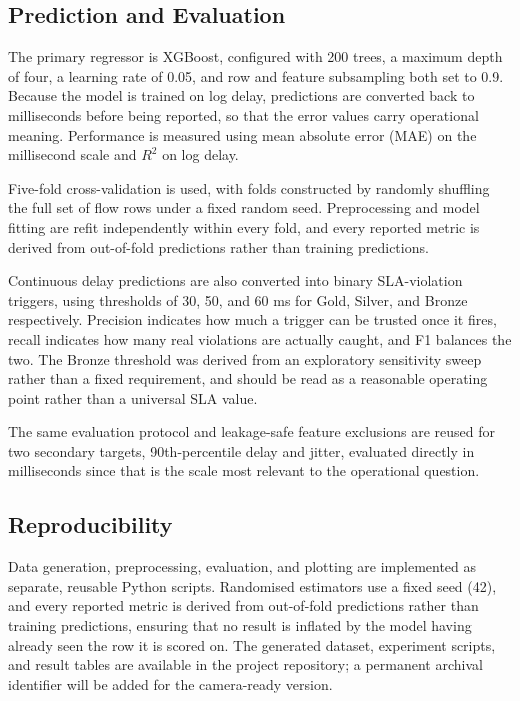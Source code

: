 \documentclass[conference]{IEEEtran}
\begin{document}
\subsection{Prediction and Evaluation}

The primary regressor is XGBoost, configured with 200 trees, a maximum depth of four, a learning rate of 0.05, and row and feature subsampling both set to 0.9. Because the model is trained on log delay, predictions are converted back to milliseconds before being reported, so that the error values carry operational meaning. Performance is measured using mean absolute error (MAE) on the millisecond scale and $R^2$ on log delay.

Five-fold cross-validation is used, with folds constructed by randomly shuffling the full set of flow rows under a fixed random seed. Preprocessing and model fitting are refit independently within every fold, and every reported metric is derived from out-of-fold predictions rather than training predictions.

Continuous delay predictions are also converted into binary SLA-violation triggers, using thresholds of 30, 50, and 60 ms for Gold, Silver, and Bronze respectively. Precision indicates how much a trigger can be trusted once it fires, recall indicates how many real violations are actually caught, and F1 balances the two. The Bronze threshold was derived from an exploratory sensitivity sweep rather than a fixed requirement, and should be read as a reasonable operating point rather than a universal SLA value.

The same evaluation protocol and leakage-safe feature exclusions are reused for two secondary targets, 90th-percentile delay and jitter, evaluated directly in milliseconds since that is the scale most relevant to the operational question.

\subsection{Reproducibility}

Data generation, preprocessing, evaluation, and plotting are implemented as separate, reusable Python scripts. Randomised estimators use a fixed seed (42), and every reported metric is derived from out-of-fold predictions rather than training predictions, ensuring that no result is inflated by the model having already seen the row it is scored on. The generated dataset, experiment scripts, and result tables are available in the project repository; a permanent archival identifier will be added for the camera-ready version.
\end{document}
